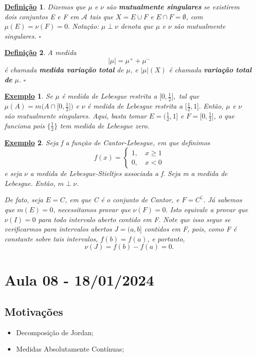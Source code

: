 \documentclass{article}
\newtheorem*{def*}{\underline{Defini\c c\~ao}}
\newtheorem{example}{\underline{Exemplo}}
\begin{document}
\begin{def*}
  Dizemos que \(\mu \) e \(\nu\) são \textbf{mutualmente singulares} se existirem dois conjuntos E e F em \(\mathcal{A}\) tais que \(X = E\cup F\) e \(E\cap F = \emptyset \), com \(\mu (E) = \nu(F) = 0.\) Notação: \(\mu \perp \nu\) denota que \(\mu \) e \(\nu\) são mutualmente singulares. \(\square\)
\end{def*}
\begin{def*}
  A medida 
    \[
      |\mu | = \mu ^{+} + \mu ^{-}
    \]
  é chamada \textbf{medida variação total} de \(\mu \), e \(|\mu |(X)\) é chamada \textbf{variação total de }\(\mu \). \(\square\)
\end{def*}
\begin{example}
  Se \(\mu \) é medida de Lebesgue restrita a \(\biggl[0, \frac{1}{2}\biggr],\) tal que \(\mu (A) = m \biggl(A \cap \biggl[0, \frac{1}{2}\biggr]\biggr) \) e \(\nu\) é medida de Lebesgue restrita a \(\biggl[\frac{1}{2}, 1\biggr].\) Então, \(\mu \) e \(\nu\) são mutualmente singulares. Aqui, basta tomar \(E = \biggl(\frac{1}{2}, 1\biggr]\) e \(F = \biggl[0, \frac{1}{2}\biggr]\), o que funciona pois 
  \(\biggl\{\frac{1}{2}\biggr\}\) tem medida de Lebesgue zero.
\end{example}
\begin{example}
  Seja f a função de Cantor-Lebesgue, em que definimos 
    \[
      f(x) = \left\{\begin{array}{ll}
          1,\quad x\geq 1 \\ 
          0,\quad x < 0
        \end{array}\right.
    \]
  e seja \(\nu\) a medida de Lebesgue-Stieltjes associada a f. Seja m a medida de Lebesgue. Então, \(m\perp \nu\).

  De fato, seja \(E = C\), em que C é o conjunto de Cantor, e \(F= C ^{\complement}.\) Já sabemos que \(m(E) = 0\), necessitamos provar que 
  \(\nu(F) = 0.\) Isto equivale a provar que \(\nu(I) = 0\) para todo intervalo aberto contido em F. Note que isso segue se verificarmos para intervalos abertos \(J = (a, b]\) contidos em F, pois, como 
F é constante sobre tais intervalos, \(f(b) = f(a)\), e portanto, 
  \[
    \nu(J) = f(b)-f(a) = 0.
  \]
\end{example}
\newpage

\section{Aula 08 - 18/01/2024}
\subsection{Motivações}
\begin{itemize}
  \item Decomposição de Jordan;
  \item Medidas Absolutamente Contínuas;
\end{itemize}
\end{document}
